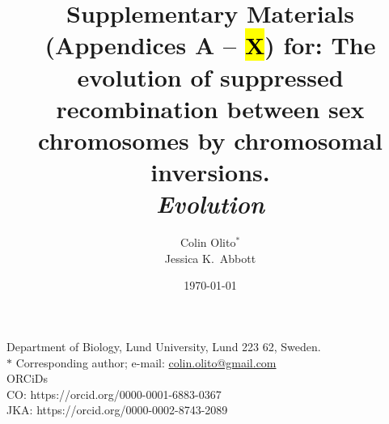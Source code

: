 \documentclass[11pt]{article}
\begin{document}
\title{Supplementary Materials (Appendices A -- \hl{X}) for: The evolution of suppressed recombination between sex chromosomes by chromosomal inversions.\\ 
\textit{Evolution} }


%
\author{Colin Olito$^{\ast}$ \\ 
Jessica K.~Abbott}
\date{\today}
\maketitle

\noindent Department of Biology, Lund University, Lund 223 62, Sweden. \\
\noindent $\ast$ Corresponding author; e-mail: \url{colin.olito@gmail.com}\\

\noindent ORCiDs\\
\noindent CO: https://orcid.org/0000-0001-6883-0367\\
\noindent JKA: https://orcid.org/0000-0002-8743-2089


\bigskip

\newpage{}
\tableofcontents
\newpage{}
% 
%
%
\end{document}
